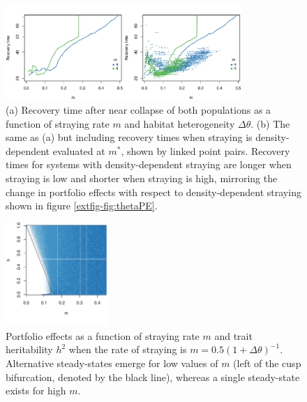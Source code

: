 \documentclass{revtex4}
\begin{document}
\begin{figure}
  \captionsetup{justification=raggedright,
singlelinecheck=false
}
\centering
\includegraphics[width=0.8\textwidth]{fig_relaxtheta2.pdf}
\caption{
(a) Recovery time after near collapse of both populations as a function of straying rate $m$ and habitat heterogeneity $\Delta\theta$.
(b) The same as (a) but including recovery times when straying is density-dependent evaluated at $m^*$, shown by linked point pairs.
Recovery times for systems with density-dependent straying are longer when straying is low and shorter when straying is high, mirroring the change in portfolio effects with respect to density-dependent straying shown in figure \ref{extfig-fig:thetaPE}.
} \label{fig:relaxtheta}
\end{figure}



\begin{figure}
  \captionsetup{justification=raggedright,
singlelinecheck=false
}
  \centering
  \includegraphics[width=0.35\textwidth]{fig_MDPE_hm_mtheta_rt.pdf}
  \caption{
  Portfolio effects as a function of straying rate $m$ and trait heritability $h^2$ when the rate of straying is $m = 0.5(1 + \Delta\theta)^{-1}$. Alternative steady-states emerge for low values of $m$ (left of the cusp bifurcation, denoted by the black line), whereas a single steady-state exists for high $m$.
  } \label{fig:mthetaPE}
\end{figure}

\end{document}

